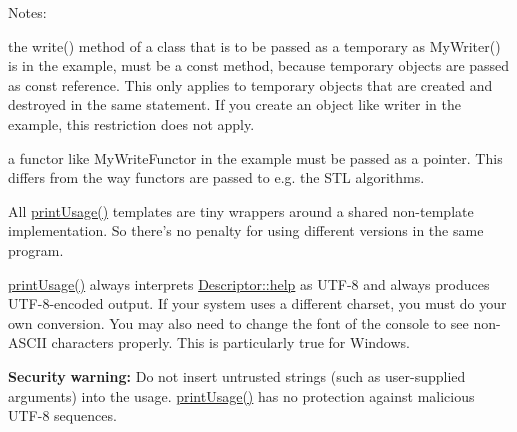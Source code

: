 \begin{DoxyParagraph}{Notes\-:}
\begin{DoxyItemize}
\item the {\ttfamily write()} method of a class that is to be passed as a temporary as {\ttfamily My\-Writer()} is in the example, must be a {\ttfamily const} method, because temporary objects are passed as const reference. This only applies to temporary objects that are created and destroyed in the same statement. If you create an object like {\ttfamily writer} in the example, this restriction does not apply. \item a functor like {\ttfamily My\-Write\-Functor} in the example must be passed as a pointer. This differs from the way functors are passed to e.\-g. the S\-T\-L algorithms. \item All \hyperlink{namespace_option_parser_a2458d437c7f439220d0b3581a5db56b1}{print\-Usage()} templates are tiny wrappers around a shared non-\/template implementation. So there's no penalty for using different versions in the same program. \item \hyperlink{namespace_option_parser_a2458d437c7f439220d0b3581a5db56b1}{print\-Usage()} always interprets \hyperlink{struct_option_parser_1_1_descriptor_ad281343957d1b5c1d617306479788f13}{Descriptor\-::help} as U\-T\-F-\/8 and always produces U\-T\-F-\/8-\/encoded output. If your system uses a different charset, you must do your own conversion. You may also need to change the font of the console to see non-\/\-A\-S\-C\-I\-I characters properly. This is particularly true for Windows. \item {\bfseries Security} {\bfseries warning\-:} Do not insert untrusted strings (such as user-\/supplied arguments) into the usage. \hyperlink{namespace_option_parser_a2458d437c7f439220d0b3581a5db56b1}{print\-Usage()} has no protection against malicious U\-T\-F-\/8 sequences.\end{DoxyItemize}

\end{DoxyParagraph}

